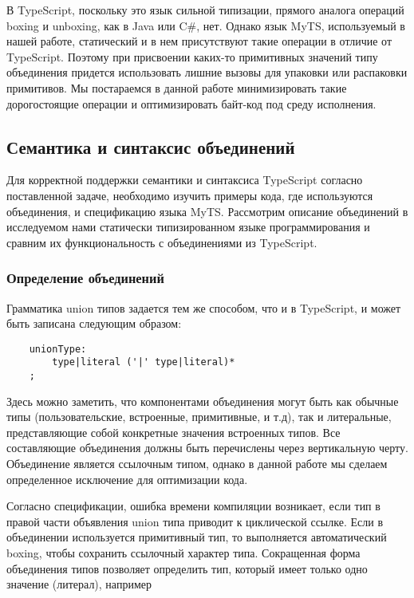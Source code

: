 В TypeScript, поскольку это язык сильной типизации, прямого аналога операций boxing и unboxing, как в Java или C\#, нет.
Однако язык MyTS, используемый в нашей работе, статический и в нем присутствуют такие операции в отличие от TypeScript.
Поэтому при присвоении каких-то примитивных значений типу объединения придется использовать лишние вызовы для упаковки
или распаковки примитивов.
Мы постараемся в данной работе минимизировать такие дорогостоящие операции и оптимизировать байт-код под среду исполнения.

\subsection{Семантика и синтаксис объединений}

Для корректной поддержки семантики и синтаксиса TypeScript согласно поставленной задаче, необходимо изучить примеры
кода, где используются объединения, и спецификацию языка MyTS\@.
Рассмотрим описание объединений в исследуемом нами статически типизированном языке программирования и сравним их
функциональность с объединениями из TypeScript.

\subsubsection{Определение объединений}

Грамматика union типов задается тем же способом, что и в TypeScript, и может быть записана следующим образом:

\begin{lstlisting}
    unionType:
        type|literal ('|' type|literal)*
    ;
\end{lstlisting}
Здесь можно заметить, что компонентами объединения могут быть как обычные типы (пользовательские, встроенные,
примитивные, и т.д), так и литеральные, представляющие собой конкретные значения встроенных типов.
Все составляющие объединения должны быть перечислены через вертикальную черту.
Объединение является ссылочным типом, однако в данной работе мы сделаем определенное исключение для оптимизации кода.

Согласно спецификации, ошибка времени компиляции возникает, если тип в правой части объявления union типа приводит к
циклической ссылке.
Если в объединении используется примитивный тип, то выполняется автоматический boxing, чтобы сохранить
ссылочный характер типа.
Сокращенная форма объединения типов позволяет определить тип, который имеет только одно значение (литерал), например

